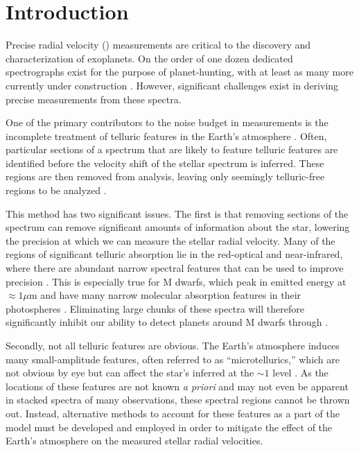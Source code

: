 \documentclass[twocolumn]{aastex62}
\begin{document}

\section{Introduction}

Precise radial velocity (\RV) measurements are critical to the discovery and characterization of exoplanets. 
On the order of one dozen dedicated spectrographs exist for the purpose of \RV planet-hunting, with at least as many more currently under construction \citep{Wright2017}. 
However, significant challenges exist in deriving precise \RV measurements from these spectra. 

One of the primary contributors to the noise budget in \RV measurements is the incomplete treatment of telluric features in the
Earth's atmosphere \citep{Halverson2016}. 
Often, particular sections of a spectrum that are likely to feature telluric features are identified before the velocity shift of the stellar spectrum is inferred. 
These regions are then removed from analysis, leaving only seemingly telluric-free regions to be analyzed \citep[e.g.][]{AngladaEscude2012}.

This method has two significant issues. 
The first is that removing sections of the spectrum can remove significant amounts of information about the star, lowering the precision at which we can measure the stellar radial velocity. 
Many of the regions of significant telluric absorption lie in the red-optical and near-infrared, where there are abundant narrow spectral features that can be used to improve \RV precision \citep{Bottom2013}. 
This is especially true for M dwarfs, which peak in emitted energy at $\approx 1 \mu$m and have many narrow molecular absorption features in their photospheres \citep{Figueira2016}. 
Eliminating large chunks of these spectra will therefore significantly inhibit our ability to detect planets around M dwarfs through \RVs.

Secondly, not all telluric features are obvious. 
The Earth's atmosphere induces many small-amplitude features, often referred to as ``microtellurics,'' which are not obvious by eye but can affect the star's inferred \RV at the $\sim 1$ \ms level \citep{Cunha2014}. 
As the locations of these features are not known \textit{a priori} and may not even be apparent in stacked spectra of many observations, these spectral regions cannot be thrown out. 
Instead, alternative methods to account for these features as a part of the model must be developed and employed in order to mitigate the effect of the Earth's atmosphere on the measured stellar radial velocities.
\end{document}
